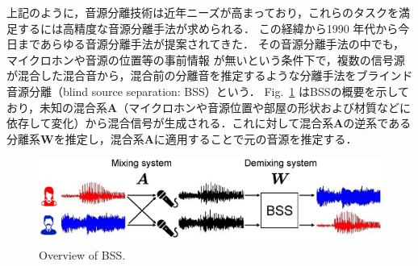 上記のように，音源分離技術は近年ニーズが高まっており，これらのタスクを満足するには高精度な音源分離手法が求められる．
この経緯から1990 年代から今日まであらゆる音源分離手法が提案されてきた．
その音源分離手法の中でも，マイクロホンや音源の位置等の事前情報
が無いという条件下で，複数の信号源が混合した混合音から，混合前の分離音を推定するような分離手法をブラインド音源分離（blind source separation: BSS）\cite{BSS}という．
Fig.~\ref{fig:bss} はBSSの概要を示しており，未知の混合系$\bm{A}$（マイクロホンや音源位置や部屋の形状および材質などに依存して変化）から混合信号が生成される．これに対して混合系$\bm{A}$の逆系である分離系$\bm{W}$を推定し，混合系$\bm{A}$に適用することで元の音源を推定する．
\begin{figure}[t]
    \vspace{4pt}
    \begin{center}
        \includegraphics[width=0.9\columnwidth]{figures/BSSimage.eps}
    \end{center}
    \vspace{-8pt}
	\caption{Overview of BSS.}
	\label{fig:bss}
\end{figure}

